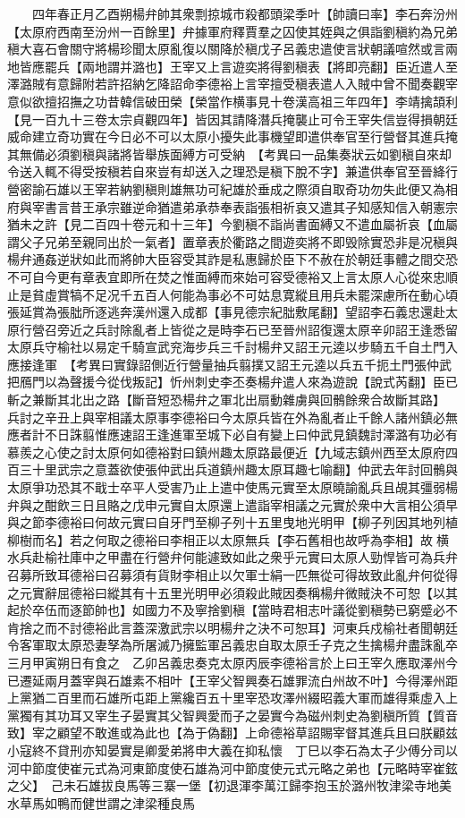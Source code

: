 　　四年春正月乙酉朔楊弁帥其衆剽掠城市殺都頭梁季叶【帥讀曰率】李石奔汾州【太原府西南至汾州一百餘里】弁據軍府釋賈羣之囚使其姪與之俱詣劉稹約為兄弟稹大喜石會關守將楊珍聞太原亂復以關降於稹戊子呂義忠遣使言狀朝議喧然或言兩地皆應罷兵【兩地謂并潞也】王宰又上言遊奕將得劉稹表【將即亮翻】臣近遣人至澤潞賊有意歸附若許招納乞降詔命李德裕上言宰擅受稹表遣人入賊中曾不聞奏觀宰意似欲擅招撫之功昔韓信破田榮【榮當作横事見十卷漢高祖三年四年】李靖擒頡利【見一百九十三卷太宗貞觀四年】皆因其請降潛兵掩襲止可令王宰失信豈得損朝廷威命建立奇功實在今日必不可以太原小擾失此事機望即遣供奉官至行營督其進兵掩其無備必須劉稹與諸將皆舉族面縛方可受納　【考異曰一品集奏狀云如劉稹自來却令送入輒不得受按稹若自來豈有却送入之理恐是稹下脫不字】兼遣供奉官至晉絳行營密諭石雄以王宰若納劉稹則雄無功可紀雄於垂成之際須自取奇功勿失此便又為相府與宰書言昔王承宗雖逆命猶遣弟承恭奉表詣張相祈哀又遣其子知感知信入朝憲宗猶未之許【見二百四十卷元和十三年】今劉稹不詣尚書面縛又不遣血屬祈哀【血屬謂父子兄弟至親同出於一氣者】置章表於衢路之間遊奕將不即毁除實恐非是况稹與楊弁通姦逆狀如此而將帥大臣容受其詐是私惠歸於臣下不赦在於朝廷事體之間交恐不可自今更有章表宜即所在焚之惟面縛而來始可容受德裕又上言太原人心從來忠順止是貧虛賞犒不足况千五百人何能為事必不可姑息寛縱且用兵未罷深慮所在動心頃張延賞為張朏所逐逃奔漢州還入成都【事見德宗紀朏敷尾翻】望詔李石義忠還赴太原行營召旁近之兵討除亂者上皆從之是時李石已至晉州詔復還太原辛卯詔王逢悉留太原兵守榆社以易定千騎宣武兖海步兵三千討楊弁又詔王元逵以步騎五千自土門入應接逢軍　【考異曰實錄詔側近行營量抽兵翦撲又詔王元逵以兵五千扼土門張仲武把鴈門以為聲援今從伐叛記】忻州刺史李丕奏楊弁遣人來為遊說【說式芮翻】臣已斬之兼斷其北出之路【斷音短恐楊弁之軍北出扇動雜虜與回鶻餘衆合故斷其路】兵討之辛丑上與宰相議太原事李德裕曰今太原兵皆在外為亂者止千餘人諸州鎮必無應者計不日誅翦惟應速詔王逢進軍至城下必自有變上曰仲武見鎮魏討澤潞有功必有慕羨之心使之討太原何如德裕對曰鎮州趣太原路最便近【九域志鎮州西至太原府四百三十里武宗之意蓋欲使張仲武出兵道鎮州趣太原耳趣七喻翻】仲武去年討回鶻與太原爭功恐其不戢士卒平人受害乃止上遣中使馬元實至太原曉諭亂兵且覘其彊弱楊弁與之酣飲三日且賂之戊申元實自太原還上遣詣宰相議之元實於衆中大言相公須早與之節李德裕曰何故元實曰自牙門至柳子列十五里曳地光明甲【柳子列因其地列植柳樹而名】若之何取之德裕曰李相正以太原無兵【李石舊相也故呼為李相】故横水兵赴榆社庫中之甲盡在行營弁何能遽致如此之衆乎元實曰太原人勁悍皆可為兵弁召募所致耳德裕曰召募須有貨財李相止以欠軍士絹一匹無從可得故致此亂弁何從得之元實辭屈德裕曰縱其有十五里光明甲必須殺此賊因奏稱楊弁微賊決不可恕【以其起於卒伍而逐節帥也】如國力不及寧捨劉稹【當時君相志叶議從劉稹勢已窮蹙必不肯捨之而不討德裕此言蓋深激武宗以明楊弁之決不可恕耳】河東兵戍榆社者聞朝廷令客軍取太原恐妻孥為所屠滅乃擁監軍呂義忠自取太原壬子克之生擒楊弁盡誅亂卒　三月甲寅朔日有食之　乙卯呂義忠奏克太原丙辰李德裕言於上曰王宰久應取澤州今已遷延兩月蓋宰與石雄素不相叶【王宰父智興奏石雄罪流白州故不叶】今得澤州距上黨猶二百里而石雄所屯距上黨纔百五十里宰恐攻澤州綴昭義大軍而雄得乘虛入上黨獨有其功耳又宰生子晏實其父智興愛而子之晏實今為磁州刺史為劉稹所質【質音致】宰之顧望不敢進或為此也【為于偽翻】上命德裕草詔賜宰督其進兵且曰朕顧兹小寇終不貸刑亦知晏實是卿愛弟將申大義在抑私懷　丁巳以李石為太子少傅分司以河中節度使崔元式為河東節度使石雄為河中節度使元式元略之弟也【元略時宰崔鉉之父】　己未石雄拔良馬等三寨一堡【初退渾李萬江歸李抱玉於潞州牧津梁寺地美水草馬如鴨而健世謂之津梁種良馬